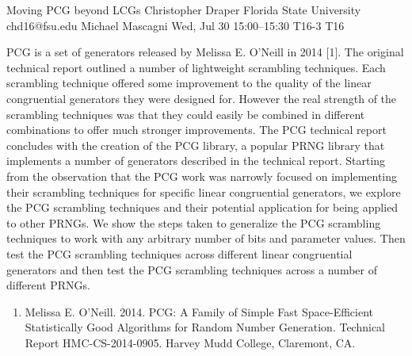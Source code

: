 \documentclass[12pt,lettersize,oneside]{book} %
\begin{document}
\begin{talk}
  {Moving PCG beyond LCGs}%
  {Christopher Draper}%
  {Florida State University}%
  {chd16@fsu.edu}%
  {Michael Mascagni}%
  {}%
  {Wed, Jul 30 15:00--15:30}%
  {T16-3}%
  {T16}%
  
    
   
PCG is a set of generators released by Melissa E. O’Neill in 2014 [1]. The original technical report outlined a number of lightweight
scrambling techniques. Each scrambling technique offered some improvement to the quality of the linear congruential generators
they were designed for. However the real strength of the scrambling techniques was that they could easily be combined in different
combinations to offer much stronger improvements. The PCG technical report concludes with the creation of the PCG library, a
popular PRNG library that implements a number of generators described in the technical report. Starting from the observation that the
PCG work was narrowly focused on implementing their scrambling techniques for specific linear congruential generators, we explore
the PCG scrambling techniques and their potential application for being applied to other PRNGs. We show the steps taken to generalize the PCG
scrambling techniques to work with any arbitrary number of bits and parameter values. Then test the PCG scrambling techniques
across different linear congruential generators and then test the PCG scrambling techniques across a number of different PRNGs.
\medskip

\begin{enumerate}
 \item[{[1]}] Melissa E. O’Neill. 2014. PCG: A Family of Simple Fast Space-Efficient Statistically Good Algorithms for Random Number Generation. Technical Report HMC-CS-2014-0905. Harvey Mudd College, Claremont, CA.
\end{enumerate}

\end{talk}
\end{document}

